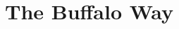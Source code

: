 \documentclass{subfile}
\begin{document}
	\chapter{The Buffalo Way}\label{ch:buffalo}
\end{document}
